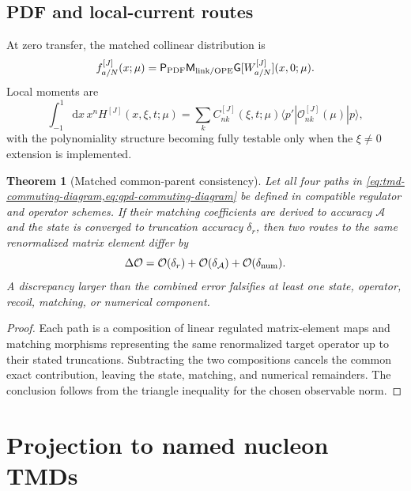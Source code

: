 \documentclass[11pt]{article}
\newtheorem{theorem}[definition]{Theorem}
\newcommand{\dd}{\mathrm{d}}
\newcommand{\cO}{\mathcal O}
\begin{document}
\subsection{PDF and local-current routes}

At zero transfer, the matched collinear distribution is
\begin{equation}
 f_{a/N}^{[J]}(x;\mu)
 =\mathsf P_{\rm PDF}
 \mathsf M_{\rm link/OPE}
 \mathsf G[W_{a/N}^{[J]}](x,0;\mu).
\label{eq:pdf-route}
\end{equation}
Local moments are
\begin{equation}
 \int_{-1}^{1}\dd x\,x^n H^{[J]}(x,\xi,t;\mu)
 =\sum_k C_{nk}^{[J]}(\xi,t;\mu)
 \langle p'|\cO_{nk}^{[J]}(\mu)|p\rangle,
\label{eq:local-moment-route}
\end{equation}
with the polynomiality structure becoming fully testable only when the
\(\xi\ne0\) extension is implemented.

\begin{theorem}[Matched common-parent consistency]
\label{thm:matched-common-parent}
Let all four paths in \cref{eq:tmd-commuting-diagram,eq:gpd-commuting-diagram}
be defined in compatible regulator and operator schemes.  If their matching
coefficients are derived to accuracy \(\mathcal A\) and the state is converged
to truncation accuracy \(\delta_r\), then two routes to the same renormalized
matrix element differ by
\begin{equation}
 \Delta\cO
 =\cO(\delta_r)+\cO(\delta_{\mathcal A})
 +\cO(\delta_{\rm num}).
\label{eq:commuting-error}
\end{equation}
A discrepancy larger than the combined error falsifies at least one state,
operator, recoil, matching, or numerical component.
\end{theorem}

\begin{proof}
Each path is a composition of linear regulated matrix-element maps and
matching morphisms representing the same renormalized target operator up to
their stated truncations.  Subtracting the two compositions cancels the
common exact contribution, leaving the state, matching, and numerical
remainders.  The conclusion follows from the triangle inequality for the
chosen observable norm.
\end{proof}

\section{Projection to named nucleon TMDs}
\label{sec:tmd-projection}
\end{document}

